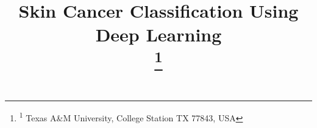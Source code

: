 \documentclass[conference]{IEEEtran}
\begin{document}
\title{Skin Cancer Classification Using Deep Learning\\
\thanks{\textsuperscript{1} Texas A\&M University, College Station TX 77843, USA}
}

\author{
\and
{}
}

\maketitle
\end{document}
